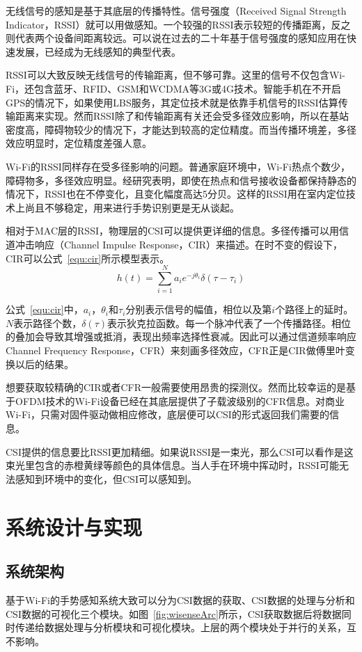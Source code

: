 无线信号的感知是基于其底层的传播特性。信号强度（Received Signal Strength Indicator，RSSI）就可以用做感知。一个较强的RSSI表示较短的传播距离，反之则代表两个设备间距离较远。可以说在过去的二十年基于信号强度的感知应用在快速发展，已经成为无线感知的典型代表。

RSSI可以大致反映无线信号的传输距离，但不够可靠。这里的信号不仅包含Wi-Fi，还包含蓝牙、RFID、GSM和WCDMA等3G或4G技术。智能手机在不开启GPS的情况下，如果使用LBS服务，其定位技术就是依靠手机信号的RSSI估算传输距离来实现。然而RSSI除了和传输距离有关还会受多径效应影响，所以在基站密度高，障碍物较少的情况下，才能达到较高的定位精度。而当传播环境差，多径效应明显时，定位精度差强人意。

Wi-Fi的RSSI同样存在受多径影响的问题。普通家庭环境中，Wi-Fi热点个数少，障碍物多，多径效应明显。经研究表明，即使在热点和信号接收设备都保持静态的情况下，RSSI也在不停变化，且变化幅度高达5分贝。这样的RSSI用在室内定位技术上尚且不够稳定，用来进行手势识别更是无从谈起。

相对于MAC层的RSSI，物理层的CSI可以提供更详细的信息。多径传播可以用信道冲击响应（Channel Impulse Response，CIR）来描述。在时不变的假设下，CIR可以公式~\ref{equ:cir}所示模型表示。
\begin{equation}
\label{equ:cir}
h\left( t \right) = \sum\limits_{i = 1}^N {{a_i}} {e^{ - j{\theta _i}}}\delta \left( {\tau  - {\tau _i}} \right)
\end{equation}

公式~\ref{equ:cir}中，$a_i$，$\theta _i$和$\tau _i$分别表示信号的幅值，相位以及第$i$个路径上的延时。$N$表示路径个数，$\delta \left( \tau \right)$表示狄克拉函数。每一个脉冲代表了一个传播路径。相位的叠加会导致其增强或抵消，表现出频率选择性衰减。因此可以通过信道频率响应Channel Frequency Response，CFR）来刻画多径效应，CFR正是CIR做傅里叶变换以后的结果。

想要获取较精确的CIR或者CFR一般需要使用昂贵的探测仪。然而比较幸运的是基于OFDM技术的Wi-Fi设备已经在其底层提供了子载波级别的CFR信息。对商业Wi-Fi，只需对固件驱动做相应修改，底层便可以CSI的形式返回我们需要的信息。

CSI提供的信息要比RSSI更加精细。如果说RSSI是一束光，那么CSI可以看作是这束光里包含的赤橙黄绿等颜色的具体信息。当人手在环境中挥动时，RSSI可能无法感知到环境中的变化，但CSI可以感知到。

\section{系统设计与实现}
\subsection{系统架构}
基于Wi-Fi的手势感知系统大致可以分为CSI数据的获取、CSI数据的处理与分析和CSI数据的可视化三个模块。如图~\ref{fig:wisenseArc}所示，CSI获取数据后将数据同时传递给数据处理与分析模块和可视化模块。上层的两个模块处于并行的关系，互不影响。

